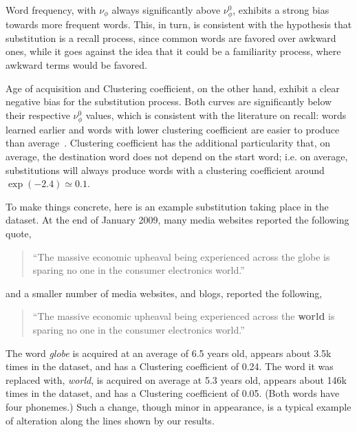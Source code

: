 Word frequency, with $\nu_{\phi}$ always significantly above $\nu_{\phi}^0$, exhibits a strong bias towards more frequent words. This, in turn, is consistent with the hypothesis that substitution is a recall process, since common words are favored over awkward ones, while it goes against the idea that it could be a familiarity process, where awkward terms would be favored.

Age of acquisition and Clustering coefficient, on the other hand, exhibit a clear negative bias for the substitution process. Both curves are significantly below their respective $\nu_{\phi}^0$ values, which is consistent with the literature on recall: words learned earlier and words with lower clustering coefficient are easier to produce than average~\citep{nelson2013activation,Zevin02}.
Clustering coefficient has the additional particularity that, on average, the destination word does not depend on the start word; i.e. on average, substitutions will always produce words with a clustering coefficient around $\exp(-2.4) \simeq 0.1$.

To make things concrete, here is an example substitution taking place in the dataset.
At the end of January 2009, many media websites reported the following quote,

\begin{quote}
    ``The massive economic upheaval being experienced across the globe is sparing no one in the consumer electronics world.''
\end{quote}
and a smaller number of media websites, and blogs, reported the following,
\begin{quote}
    ``The massive economic upheaval being experienced across the \textbf{world} is sparing no one in the consumer electronics world.''
\end{quote}
The word \emph{globe} is acquired at an average of 6.5 years old, appears about 3.5k times in the dataset, and has a Clustering coefficient of 0.24.
The word it was replaced with, \emph{world}, is acquired on average at 5.3 years old, appears about 146k times in the dataset, and has a Clustering coefficient of 0.05. (Both words have four phonemes.)
Such a change, though minor in appearance, is a typical example of alteration along the lines shown by our results.

